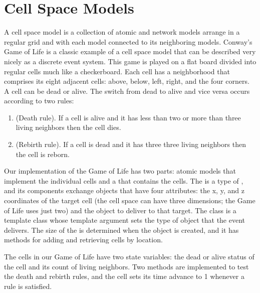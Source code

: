 \section{Cell Space Models}
A cell space model is a collection of atomic and network models arrange in a regular grid and with each model connected to its neighboring models. Conway's Game of Life is a classic example of a cell space model that can be described very nicely as a discrete event system. This game is played on a flat board divided into regular cells much like a checkerboard. Each cell has a neighborhood that comprises its eight adjacent cells: above, below, left, right, and the four corners. A cell can be dead or alive. The switch from dead to alive and vice versa occurs according to two rules:
\begin{enumerate}
\item (Death rule). If a cell is alive and it has less than two or more than three living neighbors then the cell dies.
\item (Rebirth rule). If a cell is dead and it has three three living neighbors then the cell is reborn.
\end{enumerate}

Our implementation of the Game of Life has two parts: atomic models that implement the individual cells and a  that contains the cells. The  is a type of , and its components exchange  objects that have four attributes: the x, y, and z coordinates of the target cell (the cell space can have three dimensions; the Game of Life uses just two) and the object to deliver to that target. The  class is a template class whose template argument sets the type of object that the event delivers. The size of the  is determined when the  object is created, and it has methods for adding and retrieving cells by location.

The  cells in our Game of Life have two state variables: the dead or alive status of the cell and its count of living neighbors. Two methods are implemented to test the death and rebirth rules, and the cell sets its time advance to 1 whenever a rule is satisfied.

